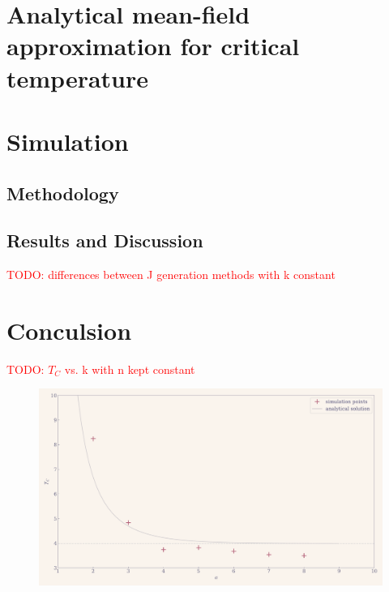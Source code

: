 \documentclass[11pt,a4paper]{article}
\newcommand{\todo}[1]{\textcolor{red}{TODO: #1}}
\begin{document}
\section{Analytical mean-field approximation for critical temperature}

\section{Simulation}

\subsection{Methodology}

\subsection{Results and Discussion}

\todo{differences between J generation methods with k constant}

\section{Conculsion}

%
%

\todo{$T_C$ vs. k with n kept constant}
\begin{figure}[ht!]
    \includegraphics[width=\linewidth]{../figures/TC_vs_alpha.pdf}
\end{figure}
\end{document}
